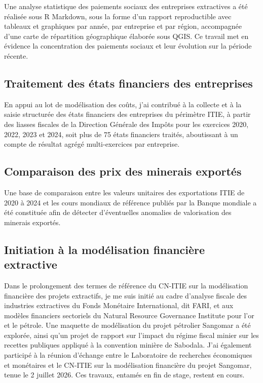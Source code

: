 \documentclass[12pt, a4paper]{article}
\begin{document}
Une analyse statistique des paiements sociaux des entreprises extractives a
été réalisée sous R Markdown, sous la forme d'un rapport reproductible avec
tableaux et graphiques par année, par entreprise et par région, accompagnée d'une carte de
répartition géographique élaborée sous QGIS. Ce travail met en évidence la
concentration des paiements sociaux et leur évolution sur la période récente.

\subsection{Traitement des états financiers des entreprises}

En appui au lot de modélisation des coûts, j'ai contribué à la collecte et à la
saisie structurée des états financiers des entreprises du périmètre ITIE, à
partir des liasses fiscales de la Direction Générale des Impôts pour les
exercices 2020, 2022, 2023 et 2024, soit plus de 75 états financiers traités,
aboutissant à un compte de résultat agrégé multi-exercices par entreprise.

\subsection{Comparaison des prix des minerais exportés}

Une base de comparaison entre les valeurs unitaires des exportations ITIE de
2020 à 2024 et les cours mondiaux de référence publiés par la Banque mondiale
a été constituée afin de
détecter d'éventuelles anomalies de valorisation des minerais exportés.

\subsection{Initiation à la modélisation financière extractive}

Dans le prolongement des termes de référence du CN-ITIE sur la modélisation
financière des projets extractifs, je me suis initié au cadre d'analyse fiscale des industries extractives du
Fonds Monétaire International, dit FARI, et aux modèles financiers sectoriels
du Natural Resource Governance Institute pour l'or et le pétrole. Une maquette de modélisation du projet
pétrolier Sangomar a été explorée, ainsi qu'un projet de rapport sur l'impact
du régime fiscal minier sur les recettes publiques appliqué à la convention
minière de Sabodala. J'ai également participé à la réunion d'échange entre le
Laboratoire de recherches économiques et monétaires et le CN-ITIE sur la
modélisation financière du projet Sangomar, tenue le 2 juillet 2026. Ces travaux, entamés en fin de stage, restent en cours.
\end{document}
